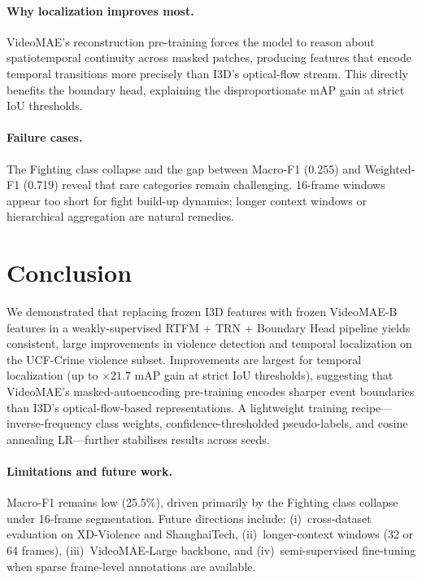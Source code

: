 \documentclass[sigconf,nonacm]{acmart}
\begin{document}
\paragraph{Why localization improves most.}
VideoMAE's reconstruction pre-training forces the model to reason about
spatiotemporal continuity across masked patches, producing features that
encode temporal transitions more precisely than I3D's optical-flow stream.
This directly benefits the boundary head, explaining the disproportionate
mAP gain at strict IoU thresholds.

\paragraph{Failure cases.}
The Fighting class collapse and the gap between Macro-F1 (0.255) and
Weighted-F1 (0.719) reveal that rare categories remain challenging.
16-frame windows appear too short for fight build-up dynamics; longer
context windows or hierarchical aggregation are natural remedies.


\section{Conclusion}

We demonstrated that replacing frozen I3D features with frozen VideoMAE-B
features in a weakly-supervised RTFM + TRN + Boundary Head pipeline yields
consistent, large improvements in violence detection and temporal localization
on the UCF-Crime violence subset.
Improvements are largest for temporal localization (up to ${\times}21.7$
mAP gain at strict IoU thresholds), suggesting that VideoMAE's
masked-autoencoding pre-training encodes sharper event boundaries than
I3D's optical-flow-based representations.
A lightweight training recipe—inverse-frequency class weights,
confidence-thresholded pseudo-labels, and cosine annealing LR—further
stabilises results across seeds.

\paragraph{Limitations and future work.}
Macro-F1 remains low (25.5\%), driven primarily by the Fighting class
collapse under 16-frame segmentation.
Future directions include: (i)~cross-dataset evaluation on XD-Violence
and ShanghaiTech, (ii)~longer-context windows (32 or 64 frames),
(iii)~VideoMAE-Large backbone, and (iv)~semi-supervised fine-tuning when
sparse frame-level annotations are available.
\end{document}
